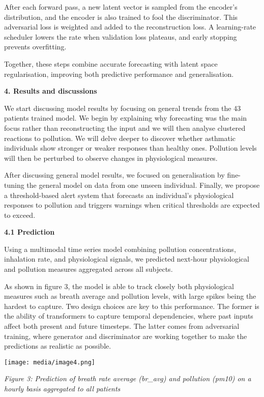 \documentclass[
]{article}
\begin{document}
After each forward pass, a new latent vector is sampled from the
encoder's distribution, and the encoder is also trained to fool the
discriminator. This adversarial loss is weighted and added to the
reconstruction loss. A learning-rate scheduler lowers the rate when
validation loss plateaus, and early stopping prevents overfitting.

Together, these steps combine accurate forecasting with latent space
regularisation, improving both predictive performance and
generalisation.

\textbf{4. Results and discussions}

We start discussing model results by focusing on general trends from the
43 patients trained model. We begin by explaining why forecasting was
the main focus rather than reconstructing the input and we will then
analyse clustered reactions to pollution. We will delve deeper to
discover whether asthmatic individuals show stronger or weaker responses
than healthy ones. Pollution levels will then be perturbed to observe
changes in physiological measures.

After discussing general model results, we focused on generalisation by
fine-tuning the general model on data from one unseen individual.
Finally, we propose a threshold-based alert system that forecasts an
individual's physiological responses to pollution and triggers warnings
when critical thresholds are expected to exceed.

\textbf{4.1 Prediction}

Using a multimodal time series model combining pollution concentrations,
inhalation rate, and physiological signals, we predicted next-hour
physiological and pollution measures aggregated across all subjects.

As shown in figure 3, the model is able to track closely both
physiological measures such as breath average and pollution levels, with
large spikes being the hardest to capture. Two design choices are key to
this performance. The former is the ability of transformers to capture
temporal dependencies, where past inputs affect both present and future
timesteps. The latter comes from adversarial training, where generator
and discriminator are working together to make the predictions as
realistic as possible.

\texttt{[image: media/image4.png]}

\emph{Figure 3: Prediction of breath rate average (br\_avg) and
pollution (pm10) on a hourly basis aggregated to all patients}
\end{document}
